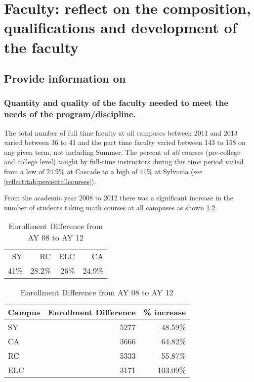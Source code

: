 \chapter{Faculty:  reflect on the composition, qualifications and development of the faculty}
\section{Provide information on}
\subsection{Quantity and quality of the faculty needed to meet the needs of the program/discipline.}
The total number of full time faculty at all campuses between 2011 and 2013 varied between 36 to 41 and the 
part time faculty varied between 143 to 158 on any given term,  not including Summer.     The percent of \emph{all} courses (pre-college and college level) taught by full-time instructors during this time period varied from a low of 24.9\% at Cascade to a high of 41\% at Sylvania (see \cref{reflect:tab:percentallcourses}).

From the academic year 2008 to 2012 there was a significant increase in the number of students taking math courses at all campuses as shown \cref{reflect:tab:enrollment}. 
\begin{table}[!htb]
  \begin{widepage}
	\begin{minipage}[t]{.5\textwidth}
		\centering
		\caption{Percentage of courses taught by full-time faculty from Summer2011--2013}
		\label{reflect:tab:percentallcourses}
		\begin{tabular}{rrrr}
			\toprule
			SY   & RC     & ELC  & CA     \\    
			41\% & 28.2\% & 26\% & 24.9\% \\
			\bottomrule
		\end{tabular}
	\end{minipage}%
	\begin{minipage}[t]{.5\textwidth}
		\centering
		\caption{Enrollment Difference from AY 08 to AY 12}
        \label{reflect:tab:enrollment}
		\begin{tabular}{lrr}
          \toprule
			Campus & Enrollment Difference & \% increase \\
            \midrule
			SY     & 5277                  & 48.59\%     \\
			CA     & 3666                  & 64.82\%     \\
			RC     & 5333                  & 55.87\%     \\
			ELC    & 3171                  & 103.09\%    \\
            \bottomrule
		\end{tabular}
	\end{minipage}
  \end{widepage}
\end{table}

